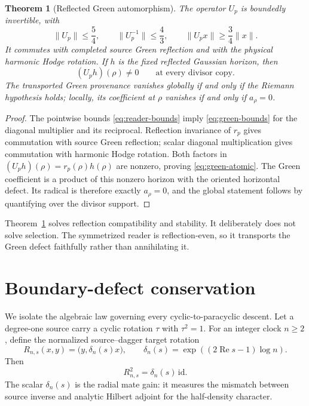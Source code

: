 \documentclass[11pt]{article}
\newtheorem{theorem}{Theorem}[section]
\theoremstyle{definition}
\theoremstyle{remark}
\newcommand{\Rea}{\operatorname{Re}}
\begin{document}
\begin{theorem}[Reflected Green automorphism]
\label{thm:green-auto}
The operator \(U_p\) is boundedly invertible, with
\[
 \|U_p\|\leq\frac54,
 \qquad
 \|U_p^{-1}\|\leq\frac43,
 \qquad
 \|U_px\|\geq\frac34\|x\|.
\tag{5.3}\label{eq:green-bounds}
\]
It commutes with completed source Green reflection and with the physical
harmonic Hodge rotation.  If \(h\) is the fixed reflected Gaussian horizon,
then
\[
 (U_ph)(\rho)\neq0
 \qquad\text{at every divisor copy}.
\tag{5.4}\label{eq:green-atomic}
\]
The transported Green provenance vanishes globally if and only if the
Riemann hypothesis holds; locally, its coefficient at \(\rho\) vanishes if
and only if \(a_\rho=0\).
\end{theorem}

\begin{proof}
The pointwise bounds \eqref{eq:reader-bounds} imply
\eqref{eq:green-bounds} for the diagonal multiplier and its reciprocal.
Reflection invariance of \(r_p\) gives commutation with source Green
reflection; scalar diagonal multiplication gives commutation with harmonic
Hodge rotation.  Both factors in
\((U_ph)(\rho)=r_p(\rho)h(\rho)\) are nonzero, proving
\eqref{eq:green-atomic}.  The Green coefficient is a product of this nonzero
horizon with the oriented horizontal defect.  Its radical is therefore
exactly \(a_\rho=0\), and the global statement follows by quantifying over
the divisor support.
\end{proof}

Theorem~\ref{thm:green-auto} solves reflection compatibility and stability.
It deliberately does not solve selection.  The symmetrized reader is
reflection-even, so it transports the Green defect faithfully rather than
annihilating it.

\section{Boundary-defect conservation}

We isolate the algebraic law governing every cyclic-to-paracyclic descent.
Let a degree-one source carry a cyclic rotation \(\tau\) with
\(\tau^2=1\).  For an integer clock \(n\geq2\), define the normalized
source--dagger target rotation
\[
 R_{n,s}(x,y)=\bigl(y,\delta_n(s)x\bigr),
 \qquad
 \delta_n(s)=\exp\!\left((2\Rea s-1)\log n\right).
\tag{6.1}\label{eq:target-rotation}
\]
Then
\[
                   R_{n,s}^2=\delta_n(s)\,\mathrm{id}.
\tag{6.2}\label{eq:paracyclic-square}
\]
The scalar \(\delta_n(s)\) is the radial mate gain: it measures the mismatch
between source inverse and analytic Hilbert adjoint for the half-density
character.
\end{document}
